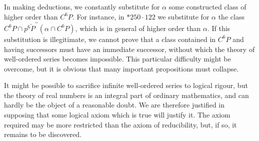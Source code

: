 \documentclass[10pt]{article}
\begin{document}
In making deductions, we constantly substitute for $\alpha$ some constructed class of higher order than $C^{6} P$. For instance, in $* 250 \cdot 122$ we substitute for $\alpha$ the class $C^{6} P \cap p^{6} \overleftarrow{P}^{\prime \prime}\left(\alpha \cap C^{6} P\right)$, which is in general of higher order than $\alpha$. If this substitution is illegitimate, we cannot prove that a class contained in $C^{6} P$ and having successors must have an immediate successor, without which the theory of well-ordered series becomes impossible. This particular difficulty might be overcome, but it is obvious that many important propositions must collapse.

It might be possible to sacrifice infinite well-ordered series to logical rigour, but the theory of real numbers is an integral part of ordinary mathematics, and can hardly be the object of a reasonable doubt. We are therefore justified in supposing that some logical axiom which is true will justify it. The axiom required may be more restricted than the axiom of reducibility, but, if so, it remains to be discovered.
\end{document}
